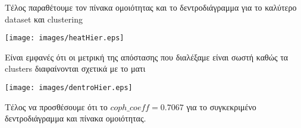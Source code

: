 Τέλος παραθέτουμε τον πίνακα ομοιότητας και το δεντροδιάγραμμα για το καλύτερο dataset και clustering

\noindent\begin{minipage}{\linewidth}
    \texttt{[image: images/heatHier.eps]}
    \label{fig:Heat}
\end{minipage}

Είναι εμφανές ότι οι μετρική της απόστασης που διαλέξαμε είναι σωστή
καθώς τα clusters διαφαίνονται σχετικά με το ματι

\noindent\begin{minipage}{\linewidth}
    \texttt{[image: images/dentroHier.eps]}
    \label{fig:Dentro}
\end{minipage}

Τέλος να προσθέσουμε ότι το $coph\_coeff = 0.7067$ για το συγκεκριμένο δεντροδιάγραμμα και πίνακα ομοιότητας.
